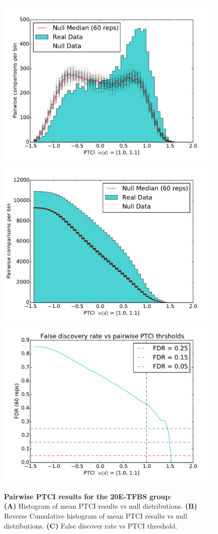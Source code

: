 
\begin{figure}[hp]
%
\subcaptionbox{\label{fig:ecr-pair-ptci-hists-base}}
{\includegraphics[width=.5\linewidth]{figures/figs/ecr_team_ptci_20130918_orthodb7/pairwise_ptci_hist.pdf}}
% 
\subcaptionbox{\label{fig:ecr-pair-ptci-hists-rcum-hist}}
{\includegraphics[width=.5\linewidth]{figures/figs/ecr_team_ptci_20130918_orthodb7/pairwise_ptci_cum_hist.pdf}}
% 
\subcaptionbox{\label{fig:ecr-pair-ptci-hists-fdr}}
{\includegraphics[width=.5\linewidth]{figures/figs/ecr_team_ptci_20130918_orthodb7/pairwise_ptci_fdr.pdf}}
% 
% 
\caption[Pairwise 20E-PTCI results]{\sf \textbf{Pairwise PTCI results for the \gls{20E}-\gls{TFBS} group}:\\
\textbf{(A)} Histogram of mean PTCI results vs null distributions.
\textbf{(B)} Reverse Cumulative histogram of mean PTCI results vs null distributions.
\textbf{(C)} False discover rate vs PTCI threshold.}
\label{fig:ecr-pair-ptci-hists}
\end{figure}